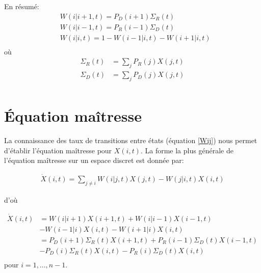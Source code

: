 En résumé:
\begin{equation}
\begin{aligned}
&W(i|i+1,t)= P_D(i+1) \Sigma_R(t)\\
&W(i|i-1,t)= P_R(i-1) \Sigma_D(t)\\
&W(i|i,t) = 1- W(i-1|i,t)- W(i+1|i,t)\\
\label{TransitionVoisins}
\end{aligned}
\end{equation}
où
\begin{equation}
\begin{aligned}
\Sigma_R	(t)	&= \sum_j P_R(j) X(j,t)\\
\Sigma_D(t) 	&= \sum_j P_D(j) X(j,t)\\
\label{SigmaRD}
\end{aligned}
\end{equation}



\section{Équation maîtresse}

La connaissance des taux de transitions entre états (équation \ref{Wij}) nous permet d'établir l'équation maîtresse pour $X(i,t)$. La forme la plus générale de l'équation maîtresse sur un espace discret \citep{vankampen} est donnée par:

\begin{equation}
\begin{aligned}
\dot{X}(i,t)= \sum_{j\neq i} W(i|j,t)X(j,t)-W(j|i,t)X(i,t)
\label{MasterGeneral}
\end{aligned}
\end{equation}

d'où

\begin{equation}
\begin{aligned}
\dot{X}(i,t)&= W(i|i+1) X(i+1,t) + W(i|i-1) X(i-1,t)\\
					&-W(i-1|i) X(i,t) -W(i+1|i) X(i,t)\\
		    &= P_D(i+1) \Sigma_R(t) X(i+1,t) + P_R(i-1) \Sigma_D(t) X(i-1,t)\\
					&-P_D(i) \Sigma_R(t) X(i,t) -P_R(i) \Sigma_D(t) X(i,t)\\
\label{Master}
\end{aligned}
\end{equation}
pour $i = 1,...,n-1$.\\

